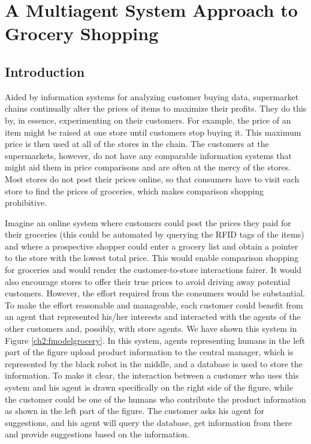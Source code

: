 \chapter{A Multiagent System Approach to Grocery Shopping}
\label{ch2}

\section{Introduction}

Aided by information systems for analyzing customer buying data, supermarket chains continually alter the prices of items to maximize their profits. They do this by, in essence, experimenting on their customers. For example, the price of an item might be raised at one store until customers stop buying it. This maximum price is then used at all of the stores in the chain. The customers at the supermarkets, however, do not have any comparable information systems that might aid them in price comparisons and are often at the mercy of the stores. Most stores do not post their prices online, so that consumers have to visit each store to find the prices of groceries, which makes comparison shopping prohibitive.

Imagine an online system where customers could post the prices they paid for their groceries (this could be automated by querying the RFID tags of the items) and where a prospective shopper could enter a grocery list and obtain a pointer to the store with the lowest total price. This would enable comparison shopping for groceries and would render the customer-to-store interactions fairer. It would also encourage stores to offer their true prices to avoid driving away potential customers. However, the effort required from the consumers would be substantial. To make the effort reasonable and manageable, each customer could benefit from an agent that represented his/her interests and interacted with the agents of the other customers and, possibly, with store agents. We have shown this system in Figure \ref{ch2:fmodelgrocery}. In this system, agents representing humans in the left part of the figure upload product information to the central manager, which is represented by the black robot in the middle, and a database is used to store the information. To make it clear, the interaction between a customer who uses this system and his agent is drawn specifically on the right side of the figure, while the customer could be one of the humans who contribute the product information as shown in the left part of the figure. The customer asks his agent for suggestions, and his agent will query the database, get information from there and provide suggestions based on the information.   


